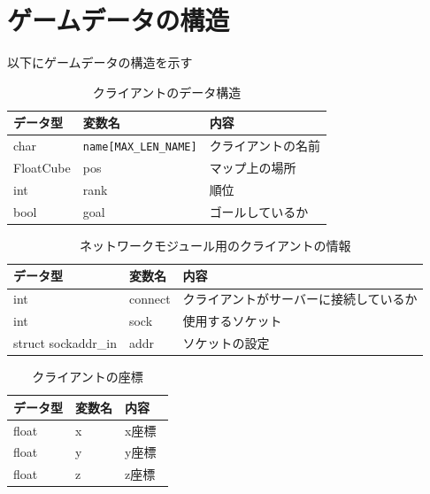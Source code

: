 \documentclass{jarticle}
\begin{document}
\section{ゲームデータの構造}
以下にゲームデータの構造を示す
\begin{table}[H]
    \caption{クライアントのデータ構造}
    \label{table:data1}
    \begin{center}
    \begin{tabular}{|l||l|l|}\hline
    データ型 & 変数名 & 内容　\\ \hline
    char & \verb+name[MAX_LEN_NAME]+ & クライアントの名前 \\ \hline
    FloatCube & pos & マップ上の場所 \\ \hline
    int & rank & 順位 \\ \hline
    bool & goal & ゴールしているか \\ \hline
    \end{tabular}
    \end{center}
\end{table}
\begin{table}[H]
    \caption{ネットワークモジュール用のクライアントの情報}
    \label{table:data2}
    \begin{center}
    \begin{tabular}{|l||l|l|}\hline
    データ型 & 変数名 & 内容　\\ \hline
    int & connect & クライアントがサーバーに接続しているか \\ \hline
    int & sock & 使用するソケット \\ \hline
    struct sockaddr\_in & addr & ソケットの設定 \\ \hline
    \end{tabular}
    \end{center}
\end{table}
\begin{table}[H]
    \caption{クライアントの座標}
    \label{table:data3}
    \begin{center}
    \begin{tabular}{|l||l|l|}\hline
    データ型 & 変数名 & 内容　\\ \hline
    float & x & x座標 \\ \hline
    float & y & y座標 \\ \hline
    float & z & z座標 \\ \hline
    \end{tabular}
    \end{center}
\end{table}
\end{document}
